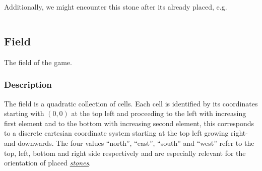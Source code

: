 \documentclass{scrartcl}
\begin{document}
Additionally, we might encounter this stone after its already placed, e.g.
\begin{mdframed}
  \begin{minipage}{0.5\textwidth}
    \inputminted{json}{examples/placed-stone.json}
  \end{minipage}%
  \begin{minipage}{0.5\textwidth}
    \begin{center}
    \end{center}
  \end{minipage}%
\end{mdframed}


\subsection{Field}
\hypertarget{field}{}
The field of the game.

\subsubsection{Description}
The field is a quadratic collection of cells. Each cell is identified by its 
coordinates starting with $(0,0)$ at the top left and proceeding to the left 
with increasing first element and to the bottom with increasing second element,
this corresponds to a discrete cartesian coordinate system starting at the top
left growing right- and downwards. The four values \enquote{north}, 
\enquote{east}, \enquote{south} and \enquote{west} refer to the top, left, 
bottom and right side respectively and are especially relevant for the 
orientation of placed \hyperlink{stone}{\emph{stones}}.
\end{document}
